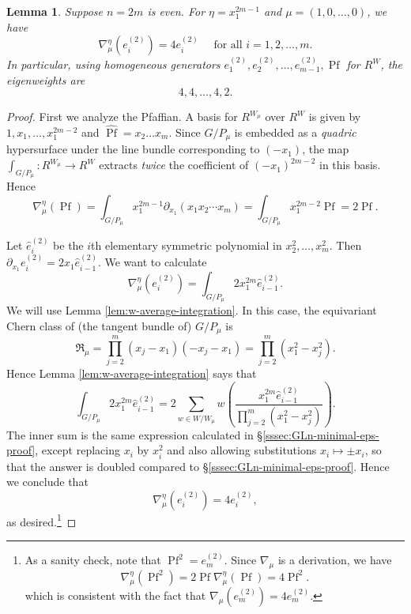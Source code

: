 \documentclass[reqno]{amsart}
\numberwithin{equation}{subsection}
\newtheorem{lemma}[subsubsection]{Lemma}
\theoremstyle{definition}
\newcommand\frR{\mathfrak{R}}
\DeclareMathOperator\Pf{Pf}
\newcommand{\wh}[1]{\widehat{#1}}
\newcommand\nb{\nabla}
\newcommand{\co}{\colon}
\begin{document}
\begin{lemma}
Suppose $n=2m$ is even. For $\eta = x_1^{2m-1}$ and $\mu=(1,0,\ldots,0)$, we have 
\[
\nabla^\eta_\mu(e_i^{(2)}) = 4 e_i^{(2)} \quad \text{ for all } i = 1, 2, \ldots, m.
\]
In particular, using homogeneous generators $e^{(2)}_{1},e^{(2)}_2, \ldots, e^{(2)}_{m-1}, \Pf$ for $R^{W}$, the eigenweights are
\begin{equation*}
4, 4, \ldots, 4, 2.
\end{equation*}
\end{lemma}

\begin{proof}
First we analyze the Pfaffian. A basis for $R^{W_{\mu}}$ over $R^{W}$ is given by $1, x_1, \ldots, x_1^{2m-2}$ and $\wh{\Pf} = x_2 \ldots x_m$. Since $G/P_\mu$ is embedded as a \emph{quadric} hypersurface under the line bundle corresponding to $(-x_1)$, the map $\int_{G/P_\mu} \co R^{W_{\mu}} \rightarrow R^W$ extracts \emph{twice} the coefficient of $(-x_{1})^{2m-2}$ in this basis. Hence
\[
\nabla_\mu^\eta(\Pf) = \int_{G/P_\mu} x_1^{2m-1} \partial_{x_1}(x_1 x_2 \cdots x_m) = \int_{G/P_\mu} x_1^{2m-2} \Pf = 2 \Pf.
\]

Let $\wh{e}_i^{(2)}$ be the $i$th elementary symmetric polynomial in $x_2^2, \ldots, x_m^2$. Then $\partial_{x_1} e_i^{(2)} = 2 x_1  \wh{e}_{i-1}^{(2)}$. We want to calculate 
\[
\nabla_\mu^\eta(e_i^{(2)}) =  \int_{G/P_\mu} 2 x_1^{2m}  \wh{e}_{i-1}^{(2)}.
\]
We will use Lemma \ref{lem:w-average-integration}. In this case, the equivariant Chern class of (the tangent bundle of) $G/P_\mu$ is 
\[
\frR_\mu = \prod_{j=2}^m (x_j-x_1)(-x_j-x_1) = \prod_{j=2}^m (x_1^2-x_j^2).
\]
Hence Lemma \ref{lem:w-average-integration} says that 
\[
\int_{G/P_\mu} 2x_1^{2m}  \wh{e}_{i-1}^{(2)} = 2 \sum_{w \in W/W_\mu} w  \left(\frac{x_1^{2m} \wh{e}_{i-1}^{(2)}}{\prod_{j=2}^m (x_1^2-x_j^2)} \right).
\]
The inner sum is the same expression calculated in \S \ref{sssec:GLn-minimal-eps-proof}, except replacing $x_i$ by $x_i^2$ and also allowing substitutions $x_i \mapsto \pm x_i$, so that the answer is doubled compared to \S \ref{sssec:GLn-minimal-eps-proof}. Hence we conclude that 
\[
\nabla_\mu^\eta(e_i^{(2)})  = 4 e_i^{(2)},
\]
as desired.\footnote{As a sanity check, note that $\Pf^{2}=e^{(2)}_{m}$. Since $\nb_{\mu}$ is a derivation, we have 
\begin{equation*}
\nb_{\mu}^{\eta}(\Pf^{2})=2 \Pf \nb_{\mu}^{\eta}(\Pf)=4\Pf^{2}.
\end{equation*}
which is consistent with the fact that $\nb_{\mu}(e^{(2)}_{m})=4e^{(2)}_{m}$.}
\end{proof}
\end{document}
